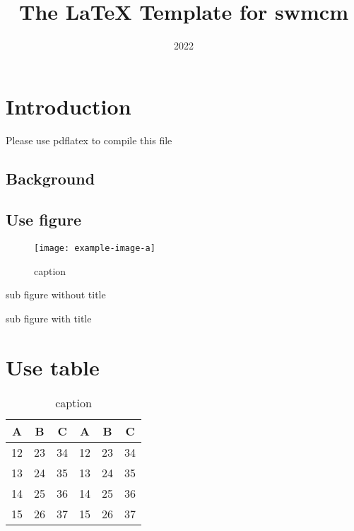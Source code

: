 \documentclass{swmcmthesis}
\title{The \LaTeX{} Template  for swmcm} %
\date{2022}
\begin{document}
\maketitle
\tableofcontents

\newpage

\setcounter{page}{1}
\section{Introduction}
\lipsum[1]

\begin{center}
{{\Huge Please use pdflatex to compile this file}}
\end{center}

\subsection{Background}
\lipsum[1-2]

\subsection{Use figure}
\lipsum[1-2]

\begin{figure}[h!t]
	\centering
	\texttt{[image: example-image-a]}
	\caption{caption}
	\label{fig:label}
\end{figure}

sub figure without title

\begin{figure}[h!t]
\centering
{}\hfill
{}
\end{figure}

\newpage
sub figure with title

\begin{figure}[h!t]
\centering
{}\hfill
{}
\end{figure}

\section{Use table}

\begin{table}[h!t]
\centering
\caption{caption}
\label{tbl:label}
\begin{tabular}{cccccc}
\toprule
A & B & C & A & B & C \\
\midrule
12 & 23 & 34 & 12 & 23 & 34 \\
13 & 24 & 35 & 13 & 24 & 35 \\
14 & 25 & 36 & 14 & 25 & 36 \\
15 & 26 & 37 & 15 & 26 & 37 \\
\bottomrule
\end{tabular}
\end{table}
\end{document}
